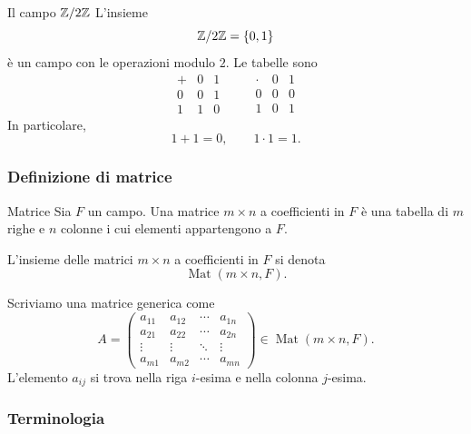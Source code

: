\documentclass[a4paper]{article}
\begin{document}
\begin{snippetexample}{Il campo \({\mathbb{Z}}/{2\mathbb{Z}}\)}
    L'insieme
    \[
        {\mathbb{Z}}/{2\mathbb{Z}}=\{0,1\}
    \]
    è un campo con le operazioni modulo \(2\). Le tabelle sono
    \[
        \begin{array}{c|cc}
            + & 0 & 1\\
            \hline
            0 & 0 & 1\\
            1 & 1 & 0
        \end{array}
        \qquad
        \begin{array}{c|cc}
            \cdot & 0 & 1\\
            \hline
            0 & 0 & 0\\
            1 & 0 & 1
        \end{array}
    \]
    In particolare,
    \[
        1+1=0,
        \qquad
        1\cdot 1=1.
    \]
\end{snippetexample}

\subsubsection{Definizione di matrice}

\begin{snippetdefinition}{Matrice}
    Sia \(F\) un campo. Una matrice \(m\times n\) a coefficienti in \(F\) è una tabella di \(m\) righe e \(n\) colonne i cui elementi appartengono a \(F\).

    L'insieme delle matrici \(m\times n\) a coefficienti in \(F\) si denota
    \[
        \operatorname{Mat}(m\times n,F).
    \]
\end{snippetdefinition}

Scriviamo una matrice generica come
\[
    A=
    \begin{pmatrix}
        a_{11} & a_{12} & \cdots & a_{1n}\\
        a_{21} & a_{22} & \cdots & a_{2n}\\
        \vdots & \vdots & \ddots & \vdots\\
        a_{m1} & a_{m2} & \cdots & a_{mn}
    \end{pmatrix}
    \in \operatorname{Mat}(m\times n,F).
\]
L'elemento \(a_{ij}\) si trova nella riga \(i\)-esima e nella colonna \(j\)-esima.

\subsubsection{Terminologia}
\end{document}
